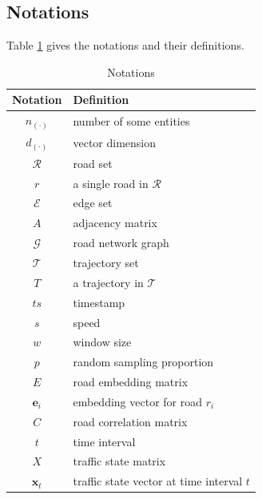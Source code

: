 \subsection{Notations}
Table \ref{notation_table} gives the notations and their definitions.
\begin{table}[h!]
    \begin{center}
        \caption{Notations}
        \label{notation_table}
        \begin{tabular}{cl}
            \toprule

            \textbf{Notation} & \textbf{Definition}                       \\

            \midrule

            $n_{(\cdot)}$     & number of some entities                   \\
            $d_{(\cdot)}$     & vector dimension                          \\
            $\mathcal R$      & road set                                  \\
            $r$               & a single road in $\mathcal R$             \\
            $\mathcal E$      & edge set                                  \\
            $A$               & adjacency matrix                          \\
            $\mathcal G$      & road network graph                        \\
            $\mathcal T$      & trajectory set                            \\
            $T$               & a trajectory in $\mathcal T$              \\
            $ts$              & timestamp                                 \\
            $s$               & speed                                     \\
            $w$               & window size                               \\
            $p$               & random sampling proportion                \\
            $E$               & road embedding matrix                     \\
            $\mathbf{e}_i$    & embedding vector for road $r_i$           \\
            $C$               & road correlation matrix                   \\
            $t$               & time interval                             \\
            $X$               & traffic state matrix                      \\
            $\mathbf x_t$     & traffic state vector at time interval $t$ \\

            \bottomrule
        \end{tabular}
    \end{center}
\end{table}

